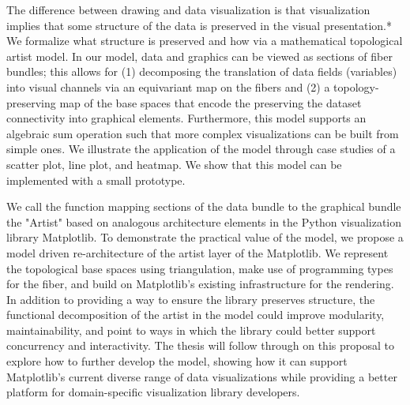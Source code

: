The difference between drawing and data visualization is that visualization implies that some structure of the data is preserved in the visual presentation.* We formalize what structure is preserved and how via a mathematical topological artist model. In our model, data and graphics can be viewed as sections of fiber bundles; this allows for (1) decomposing the translation of data fields (variables) into visual channels via an equivariant map on the fibers and (2) a topology-preserving map of the base spaces that encode the preserving the dataset connectivity into graphical elements. Furthermore, this model supports an algebraic sum operation such that more complex visualizations can be built from simple ones. We illustrate the application of the model through case studies of a scatter plot, line plot, and heatmap. We show that this model can be implemented with a small prototype.

We call the function mapping sections of the data bundle to the graphical bundle the "Artist" based on analogous architecture elements in the Python visualization library Matplotlib. To demonstrate the practical value of the model, we propose a model driven re-architecture of the artist layer of the Matplotlib. We represent the topological base spaces using triangulation, make use of programming types for the fiber, and build on Matplotlib's existing infrastructure for the rendering. In addition to providing a way to ensure the library preserves structure, the functional decomposition of the artist in the model could improve modularity, maintainability, and point to ways in which the library could better support concurrency and interactivity. The thesis will follow through on this proposal to explore how to further develop the model, showing how it can support Matplotlib's current diverse range of data visualizations while providing a better platform for domain-specific visualization library developers.
